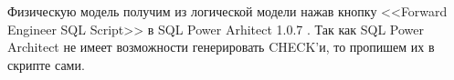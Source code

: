 








Физическую модель получим из логической модели нажав кнопку <<Forward Engineer SQL Script>>
в SQL Power Arhitect 1.0.7 \cite{SqlPowerArhitect}.
Так как SQL Power Architect не имеет возможности генерировать CHECK'и,
то пропишем их в скрипте сами.

